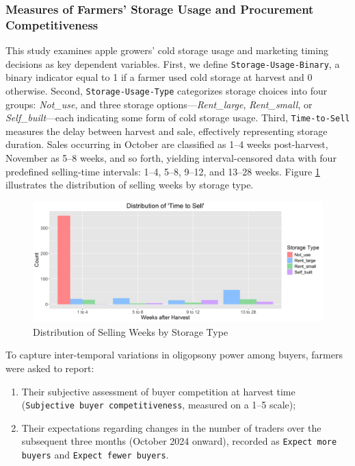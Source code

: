 \documentclass[12pt]{article}
\begin{document}
\subsubsection{Measures of Farmers' Storage Usage and Procurement Competitiveness}
\noindent This study examines apple growers' cold storage usage and marketing timing decisions as key dependent variables. First, we define \texttt{Storage-Usage-Binary}, a binary indicator equal to 1 if a farmer used cold storage at harvest and 0 otherwise. Second, \texttt{Storage-Usage-Type} categorizes storage choices into four groups: \textit{Not\_use}, and three storage options—\textit{Rent\_large}, \textit{Rent\_small}, or \textit{Self\_built}—each indicating some form of cold storage usage. Third, \texttt{Time-to-Sell} measures the delay between harvest and sale, effectively representing storage duration. Sales occurring in October are classified as 1–4 weeks post-harvest, November as 5–8 weeks, and so forth, yielding interval-censored data with four predefined selling-time intervals: 1–4, 5–8, 9–12, and 13–28 weeks. Figure \ref{Figure: selling weeks distribution} illustrates the distribution of selling weeks by storage type.

\begin{figure}[H]
\centering
\includegraphics[width=1\textwidth]{figures/selling_weeks_distribution.png}
\caption{Distribution of Selling Weeks by Storage Type}
\label{Figure: selling weeks distribution}
\end{figure}

To capture inter-temporal variations in oligopsony power among buyers, farmers were asked to report:
\begin{enumerate}
    \item Their subjective assessment of buyer competition at harvest time (\texttt{Subjective buyer competitiveness}, measured on a 1–5 scale);
    \item Their expectations regarding changes in the number of traders over the subsequent three months (October 2024 onward), recorded as \texttt{Expect more buyers} and \texttt{Expect fewer buyers}.
\end{enumerate}
\end{document}
